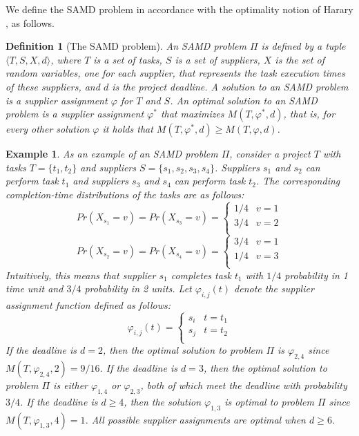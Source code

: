 \documentclass[letterpaper]{article} %
\newtheorem{definition}{Definition}
\newtheorem{example}{Example}
\newcommand{\samd}{\ac{SAMD}\xspace}
\begin{document}
We define the \samd problem in accordance with the optimality notion of Harary , as follows. %
\begin{definition}[The \samd problem]
An \samd problem $\Pi$ is defined by a tuple 
 $\langle T, S, X, d\rangle$, 
 where $T$ is a set of tasks, 
 $S$ is a set of suppliers, 
 $X$ is the set of random variables, one for each supplier, that represents the task execution times of these suppliers,
 and $d$ is the project deadline. 
 A solution to an \samd problem is a supplier assignment $\varphi$ for $T$ and $S$. An optimal solution to an \samd problem is
 a supplier assignment $\varphi^*$ that maximizes $M(T, \varphi^*, d)$, that is, for every other solution  $\varphi$ it holds that $M(T, \varphi^*, d)\geq M(T, \varphi, d)$. 
\end{definition}
 
\begin{example}
\label{ex:ex1}
As an example of an \samd problem $\Pi$, consider a project $T$ with tasks $T=\{t_1, t_2\}$ and suppliers $S=\{s_1, s_2, s_3, s_4\}$. 
Suppliers $s_1$ and $s_2$ can perform task $t_1$ 
and suppliers $s_3$ and $s_4$ can perform task $t_2$. 
The corresponding completion-time distributions of the tasks are as follows:
\[ Pr(X_{s_1}=v)=Pr(X_{s_3}=v)=
\begin{cases}
      1/4 & v=1\\
      3/4 & v=2\\
\end{cases}
\]
\[ Pr(X_{s_2}=v)=Pr(X_{s_4}=v)=
\begin{cases}
      3/4 & v=1\\
      1/4 & v=3\\
\end{cases}
\]
Intuitively, this means that supplier $s_1$ completes task $t_1$ with $1/4$ probability in 1 time unit and $3/4$ probability in 2 units.
Let $\varphi_{i,j}(t)$ denote the supplier assignment function defined as follows:
\[\varphi_{i,j}(t)=
\begin{cases}
      s_i & t=t_1\\
      s_j & t=t_2\\
\end{cases}\]
If the deadline is $d=2$, then the optimal solution to problem $\Pi$ is $\varphi_{2,4}$ 
since $M(T, \varphi_{2,4}, 2)=9/16$.
If the deadline is $d=3$, then the optimal solution to problem $\Pi$ is either $\varphi_{1,4}$ 
or $\varphi_{2,3}$, both of which meet the deadline with probability $3/4$. If the deadline is $d\geq 4$, then the solution $\varphi_{1,3}$ is optimal to problem $\Pi$ since $M(T, \varphi_{1,3}, 4)=1$. All possible supplier assignments are optimal when $d\geq 6$.
\end{example} %
\end{document}

